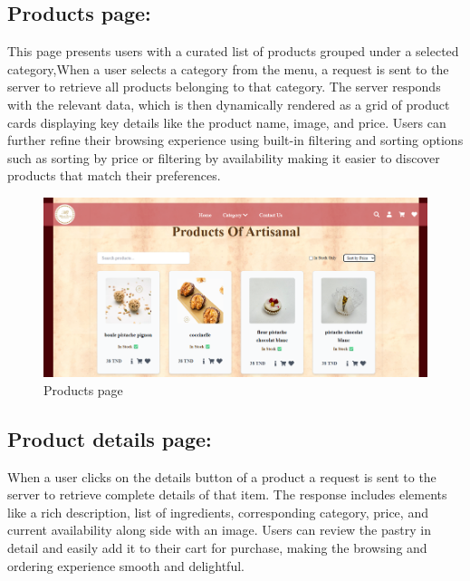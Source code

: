 \newpage
\subsection{Products page:}

This page presents users with a curated list of products grouped under a selected category,When a user selects a category from the menu, a request is sent to the server to retrieve all products belonging to that category. The server responds with the relevant data, which is then dynamically rendered as a grid of product cards displaying key details like the product name, image, and price. Users can further refine their browsing experience using built-in filtering and sorting options such as sorting by price or filtering by availability making it easier to discover products that match their preferences.

\begin{figure}[!h]
\begin{center}
\includegraphics{images/products.png}
\end{center}
\caption{Products page}
\end{figure}

\subsection{Product details page:}

When a user clicks on the details button of a product a request is sent to the server to retrieve complete details of that item. The response includes elements like a rich description, list of ingredients, corresponding category, price, and current availability along side with an image. Users can review the pastry in detail and easily add it to their cart for purchase, making the browsing and ordering experience smooth and delightful.

